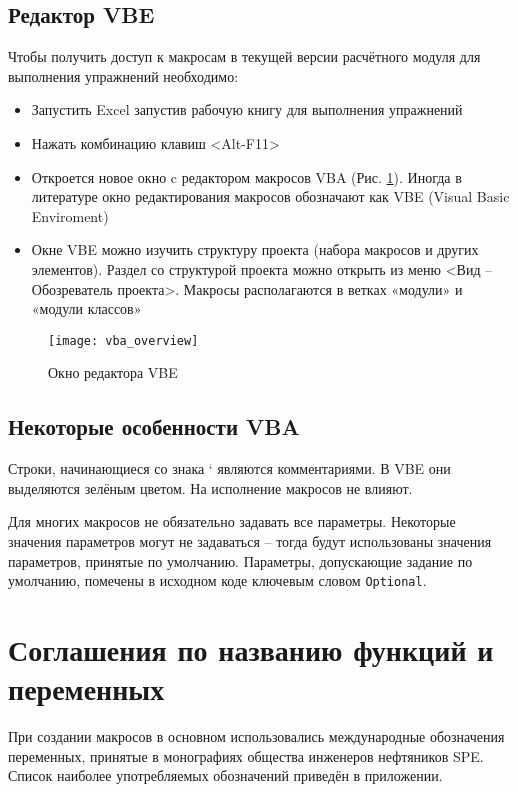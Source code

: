 \subsection{Редактор VBE}
Чтобы получить доступ к макросам в текущей версии расчётного модуля для выполнения упражнений необходимо:
\begin{itemize}
	\item Запустить Excel запустив рабочую книгу для выполнения упражнений
	\item Нажать комбинацию клавиш <Alt-F11>
	\item Откроется новое окно c редактором макросов VBA (Рис. \ref{ris:VBA_overview}). Иногда в литературе окно редактирования макросов обозначают как VBE (Visual Basic Enviroment)
	\item Окне VBE можно изучить структуру проекта (набора макросов и других элементов). Раздел со структурой проекта можно открыть из меню <Вид – Обозреватель проекта>. Макросы располагаются в ветках «модули» и «модули классов»
	
\end{itemize}

\begin{figure}[ht]
	\texttt{[image: vba\_overview]}
	\caption{Окно редактора VBE}
	\label{ris:VBA_overview}
\end{figure}


\subsection{Некоторые особенности VBA}
Строки, начинающиеся со знака ‘ являются комментариями. В VBE они выделяются зелёным цветом. На исполнение макросов не влияют.

Для многих макросов не обязательно задавать все параметры. Некоторые значения параметров могут не задаваться – тогда будут использованы значения параметров, принятые по умолчанию. Параметры, допускающие задание по умолчанию, помечены в исходном коде ключевым словом \texttt{Optional}.

\section{Соглашения по названию функций и переменных \unf{}}
При создании макросов в основном использовались международные обозначения переменных, принятые в монографиях общества инженеров нефтяников SPE. Список наиболее употребляемых обозначений приведён в приложении. 


